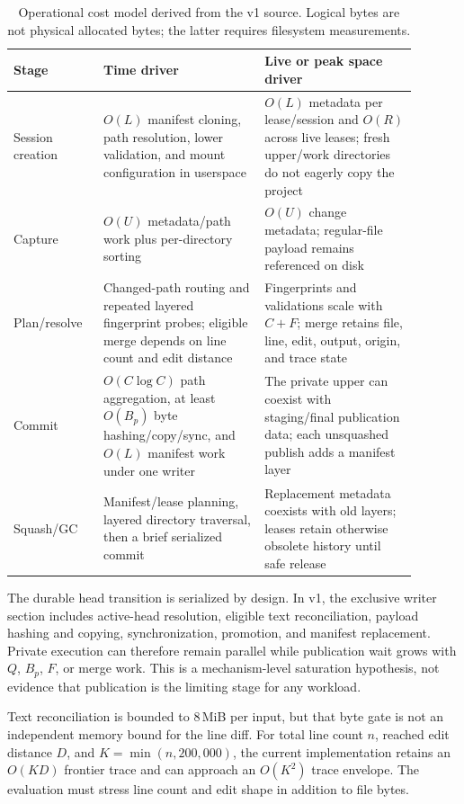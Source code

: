 \begin{table}[H]
\centering
\small
\begin{tabular}{p{0.19\linewidth}p{0.36\linewidth}p{0.34\linewidth}}
\hline
Stage & Time driver & Live or peak space driver \\
\hline
Session creation &
$O(L)$ manifest cloning, path resolution, lower validation, and mount
configuration in userspace &
$O(L)$ metadata per lease/session and $O(R)$ across live leases; fresh
upper/work directories do not eagerly copy the project \\
Capture &
$O(U)$ metadata/path work plus per-directory sorting &
$O(U)$ change metadata; regular-file payload remains referenced on disk \\
Plan/resolve &
Changed-path routing and repeated layered fingerprint probes; eligible merge
depends on line count and edit distance &
Fingerprints and validations scale with $C+F$; merge retains file, line,
edit, output, origin, and trace state \\
Commit &
$O(C\log C)$ path aggregation, at least $O(B_p)$ byte hashing/copy/sync, and
$O(L)$ manifest work under one writer &
The private upper can coexist with staging/final publication data; each
unsquashed publish adds a manifest layer \\
Squash/GC &
Manifest/lease planning, layered directory traversal, then a brief serialized
commit &
Replacement metadata coexists with old layers; leases retain otherwise
obsolete history until safe release \\
\hline
\end{tabular}
\caption{Operational cost model derived from the v1 source.  Logical bytes are
not physical allocated bytes; the latter requires filesystem measurements.}
\label{tab:cost-model}
\end{table}

The durable head transition is serialized by design.  In v1, the exclusive
writer section includes active-head resolution, eligible text reconciliation,
payload hashing and copying, synchronization, promotion, and manifest
replacement.  Private execution can therefore remain parallel while
publication wait grows with $Q$, $B_p$, $F$, or merge work.  This is a
mechanism-level saturation hypothesis, not evidence that publication is the
limiting stage for any workload.

Text reconciliation is bounded to 8\,MiB per input, but that byte gate is not
an independent memory bound for the line diff.  For total line count $n$,
reached edit distance $D$, and $K=\min(n,200{,}000)$, the current implementation
retains an $O(KD)$ frontier trace and can approach an $O(K^2)$ trace envelope.
The evaluation must stress line count and edit shape in addition to file bytes.

